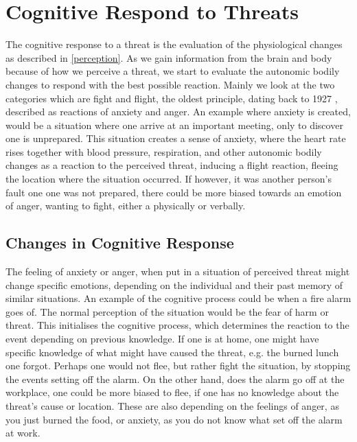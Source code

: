 \section{Cognitive Respond to Threats}\label{cognition}
The cognitive response to a threat is the evaluation of the physiological changes as described in \ref{perception}. As we gain information from the brain and body because of how we perceive a threat, we start to evaluate the autonomic bodily changes to respond with the best possible reaction. Mainly we look at the two categories which are fight and flight, the oldest principle, dating back to 1927 \cite{bodily_changes}, described as reactions of anxiety and anger. An example where anxiety is created, would be a situation where one arrive at an important meeting, only to discover one is unprepared. This situation creates a sense of anxiety, where the heart rate rises together with blood pressure, respiration, and other autonomic bodily changes as a reaction to the perceived threat, inducing a flight reaction, fleeing the location where the situation occurred. If however, it was another person's fault one one was not prepared, there could be more biased towards an emotion of anger, wanting to fight, either a physically or verbally. \cite{bodily_changes}

\subsection{Changes in Cognitive Response}\label{cognitive_response}
The feeling of anxiety or anger, when put in a situation of perceived threat might change specific emotions, depending on the individual and their past memory of similar situations. An example of the cognitive process could be when a fire alarm goes of. The normal perception of the situation would be the fear of harm or threat. This initialises the cognitive process, which determines the reaction to the event depending on previous knowledge. If one is at home, one might have specific knowledge of what might have caused the threat, e.g. the burned lunch one forgot. Perhaps one would not flee, but rather fight the situation, by stopping the events setting off the alarm. On the other hand, does the alarm go off at the workplace, one could be more biased to flee, if one has no knowledge about the threat’s cause or location. These are also depending on the feelings of anger, as you just burned the food, or anxiety, as you do not know what set off the alarm at work.\cite{bodily_changes}

